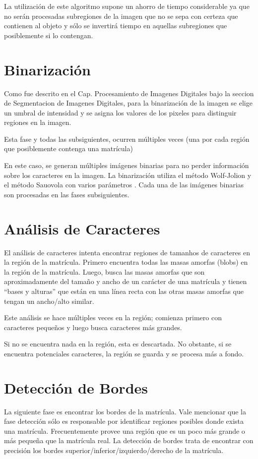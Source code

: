 La utilización de este algoritmo supone un ahorro de tiempo considerable ya que no serán procesadas subregiones de la imagen que no se sepa con certeza que contienen al objeto y sólo se invertirá tiempo en aquellas subregiones que posiblemente si lo contengan. \parencite{Viola2001-rh}

\section{Binarización}
Como fue descrito en el Cap. Procesamiento de Imagenes Digitales bajo la seccion de Segmentacion de Imagenes Digitales, para la binarización de la imagen se elige un umbral de intensidad y se asigna los valores de los pixeles para distinguir regiones en la imagen.

Esta fase y todas las subsiguientes, ocurren múltiples veces (una por cada región que posiblemente contenga una matrícula)

En este caso, se generan múltiples imágenes binarias para no perder información sobre los caracteres en la imagen. La binarización utiliza el método Wolf-Jolion y el método Sauovola con varios parámetros \parencite{Wolf2004-so,Oliveira2009-io}. Cada una de las imágenes binarias son procesadas en las fases subsiguientes.
\section{Análisis de Caracteres}
El análisis de caracteres intenta encontrar regiones de tamanhos de caracteres en la región de la matrícula. Primero encuentra todas las masas amorfas (blobs) en la región de la matrícula. Luego, busca las masas amorfas que son aproximadamente del tamaño y ancho de un carácter de una matrícula y tienen “bases y alturas” que están en una línea recta con las otras masas amorfas que tengan un ancho/alto similar.

Este análisis se hace múltiples veces en la región; comienza primero con caracteres pequeños y luego busca caracteres más grandes.

Si no se encuentra nada en la región, esta es descartada. No obstante, si se encuentra potenciales caracteres, la región se guarda y se procesa más a fondo.
\section{Detección de Bordes}
La siguiente fase es encontrar los bordes de la matrícula. Vale mencionar que la fase detección sólo es responsable por identificar regiones posibles donde exista una matrícula. Frecuentemente provee una región que es un poco más grande o más pequeña que la matrícula real. La detección de bordes trata de encontrar con precisión los bordes superior/inferior/izquierdo/derecho de la matrícula.

